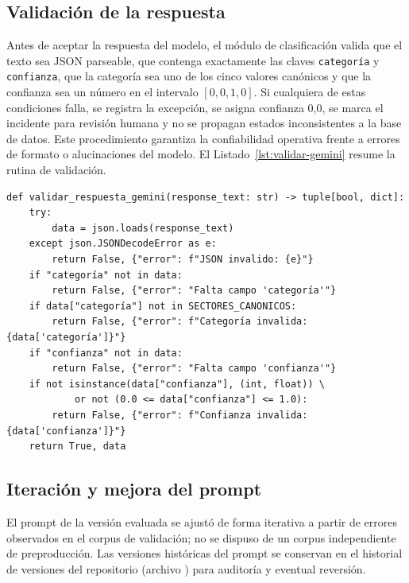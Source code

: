\subsection{Validación de la respuesta}\label{subsec:anexo-validacion-respuesta}

Antes de aceptar la respuesta del modelo, el módulo de clasificación valida que el texto sea JSON parseable, que contenga exactamente las claves \texttt{categoría} y \texttt{confianza}, que la categoría sea uno de los cinco valores canónicos y que la confianza sea un número en el intervalo \([0{,}0, 1{,}0]\). Si cualquiera de estas condiciones falla, se registra la excepción, se asigna confianza 0,0, se marca el incidente para revisión humana y no se propagan estados inconsistentes a la base de datos. Este procedimiento garantiza la confiabilidad operativa frente a errores de formato o alucinaciones del modelo. El Listado~\ref{lst:validar-gemini} resume la rutina de validación.

\begin{lstlisting}[caption={Validación de la respuesta de Gemini (resumen).},label={lst:validar-gemini}]
def validar_respuesta_gemini(response_text: str) -> tuple[bool, dict]:
    try:
        data = json.loads(response_text)
    except json.JSONDecodeError as e:
        return False, {"error": f"JSON invalido: {e}"}
    if "categoría" not in data:
        return False, {"error": "Falta campo 'categoría'"}
    if data["categoría"] not in SECTORES_CANONICOS:
        return False, {"error": f"Categoría invalida: {data['categoría']}"}
    if "confianza" not in data:
        return False, {"error": "Falta campo 'confianza'"}
    if not isinstance(data["confianza"], (int, float)) \
            or not (0.0 <= data["confianza"] <= 1.0):
        return False, {"error": f"Confianza invalida: {data['confianza']}"}
    return True, data
\end{lstlisting}

\subsection{Iteración y mejora del prompt}\label{subsec:anexo-iteracion-prompt}

El prompt de la versión evaluada se ajustó de forma iterativa a partir de errores observados en el corpus de validación; no se dispuso de un corpus independiente de preproducción. Las versiones históricas del prompt se conservan en el historial de versiones del repositorio (archivo ) para auditoría y eventual reversión.

